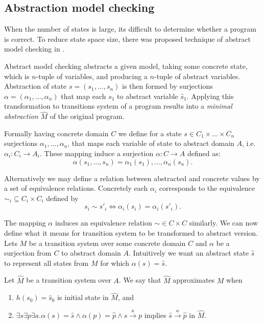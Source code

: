 \subsection{Abstraction model checking} \label{subsec:amc}

When the number of states is large, its difficult to determine whether a program
is correct. To reduce state space size, there was proposed technique of
abstract model checking in \cite{Clarke94}.

Abstract model checking abstracts a given model, taking some concrete state,
which is $n$-tuple of variables, and producing a $n$-tuple of abstract
variables. Abstraction of state $s = (s_1,\dots,s_n)$ is then formed by surjections
$\alpha = (\alpha_1,\dots,\alpha_n)$ that map each $s_1$ to abstract variable $\widehat{s}_1$.
Applying this transformation to transitions system of a program
results into a \emph{minimal abstraction} $\widehat{M}$ of the original program.

Formally having concrete domain $C$ we define for a state $s \in C_1 \times \dots \times C_n$
surjections $\alpha_1,\dots,\alpha_n$, that maps each variable of state to abstract domain
$A$, i.e. $\alpha_i : C_i \rightarrow A_i$. These mapping induce
a surjection $\alpha: C \rightarrow A$ defined as:
$$\alpha(s_1,\dots, s_n) = \alpha_1(s_1), \dots , \alpha_n(s_n).$$

\noindent
Alternatively we may define a relation between abstracted and concrete values by
a set of equivalence relations. Concretely each $\alpha_i$ corresponds to the
equivalence ${\sim}_i \subseteq C_i \times C_i$ defined by
$$s_i  \sim s'_i \iff \alpha_i(s_i) = \alpha_i(s'_i).$$

The mapping $\alpha$ induces an equivalence relation $\sim \in C \times C$ similarly.
We can now define what it means for transition system to be transformed to
abstract version. Lets $M$ be a transition system over some concrete domain $C$ and
$\alpha$ be a surjection from $C$ to abstract domain $A$. Intuitively we want an
abstract state $\widehat{s}$ to represent all states from $M$ for which $\alpha(s) =
\widehat{s}$.

\begin{definition}\label{def:am}
    Let $\widehat{M}$ be a transition system over $A$. We say that $\widehat{M}$
    approximates $M$ when
    \begin{enumerate}
        \item $h(s_0) = \widehat{s}_0$ is initial state in $\widehat{M}$, and
        \item $\exists s \exists p \exists a . \alpha(s) = \widehat{s} \wedge \alpha(p) = \widehat{p} \wedge s
               \xrightarrow[]{a} p$ implies $\widehat{s}
               \xrightarrow[]{a} \widehat{p}$ in $\widehat{M}$.
    \end{enumerate}
\end{definition}

